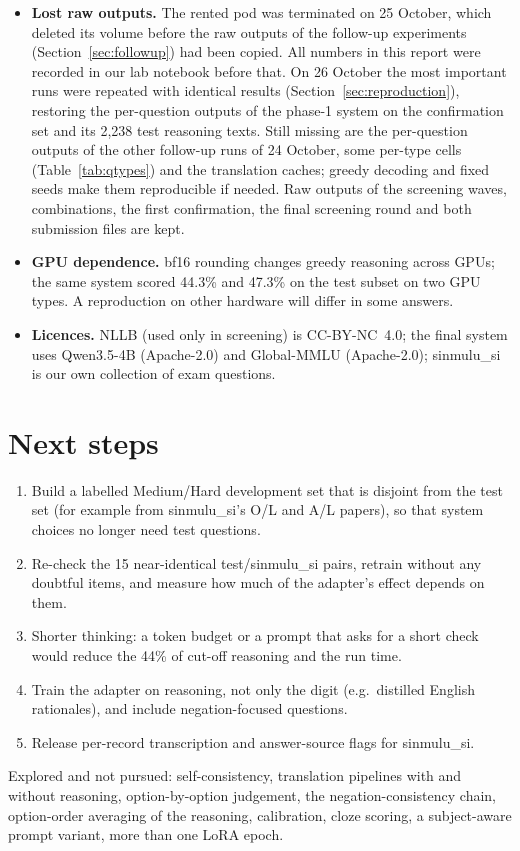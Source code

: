 \documentclass[10pt,a4paper]{article}
\begin{document}
\begin{itemize}
were printed once; for submission 2, the number of answers that differ from submission 1 was counted. Neither uses
labels, nothing was chosen from them, and no other test-set statistic was computed.
\item \textbf{Lost raw outputs.} The rented pod was terminated on 25 October, which deleted its volume before the raw
outputs of the follow-up experiments (Section~\ref{sec:followup}) had been copied. All numbers in this report were
recorded in our lab notebook before that. On 26 October the most important runs were repeated with identical results
(Section~\ref{sec:reproduction}), restoring the per-question outputs of the phase-1 system on the confirmation set and
its 2,238 test reasoning texts. Still missing are the per-question outputs of the other follow-up runs of 24 October,
some per-type cells (Table~\ref{tab:qtypes}) and the translation caches; greedy decoding and fixed seeds make them
reproducible if needed. Raw outputs of the screening waves, combinations, the first confirmation, the final screening
round and both submission files are kept.
\item \textbf{GPU dependence.} bf16 rounding changes greedy reasoning across GPUs; the same system scored 44.3\% and
47.3\% on the test subset on two GPU types. A reproduction on other hardware will differ in some answers.
\item \textbf{Licences.} NLLB (used only in screening) is CC-BY-NC~4.0; the final system uses Qwen3.5-4B
(Apache-2.0) and Global-MMLU (Apache-2.0); sinmulu\_si is our own collection of exam questions.
\end{itemize}

\section{Next steps}
\begin{enumerate}
\item Build a labelled Medium/Hard development set that is disjoint from the test set (for example from sinmulu\_si's
O/L and A/L papers), so that system choices no longer need test questions.
\item Re-check the 15 near-identical test/sinmulu\_si pairs, retrain without any doubtful items, and measure how much
of the adapter's effect depends on them.
\item Shorter thinking: a token budget or a prompt that asks for a short check would reduce the 44\% of cut-off
reasoning and the run time.
\item Train the adapter on reasoning, not only the digit (e.g.\ distilled English rationales), and include
negation-focused questions.
\item Release per-record transcription and answer-source flags for sinmulu\_si.
\end{enumerate}
Explored and not pursued: self-consistency, translation pipelines with and without reasoning, option-by-option
judgement, the negation-consistency chain, option-order averaging of the reasoning, calibration, cloze scoring, a
subject-aware prompt variant, more than one LoRA epoch.
\end{document}
